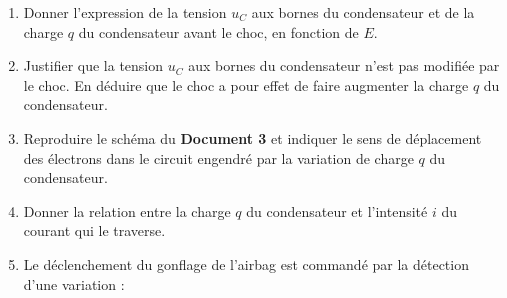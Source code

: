 \documentclass[a4paper,11pt,fleqn]{scrartcl}%
\begin{document}
\begin{enumerate}
\begin{enumerate}
		\item Donner l'expression de la tension $u_C$ aux bornes du condensateur et de la charge $q$ du condensateur avant le choc, en fonction de $E$.
		\item Justifier que la tension $u_C$ aux bornes du condensateur n'est  pas modifiée par le choc. En déduire que le choc a pour effet de faire augmenter la charge $q$ du condensateur.
		\item Reproduire le schéma du \textbf{Document 3} et indiquer le sens de déplacement des électrons dans le circuit engendré par la variation de charge $q$ du condensateur.
		\item Donner la relation entre la charge $q$ du condensateur et l'intensité $i$ du courant qui le traverse.
		\item Le déclenchement du gonflage de l'airbag est commandé par la détection d'une variation :
	\end{enumerate}
\end{enumerate}
\end{document}
